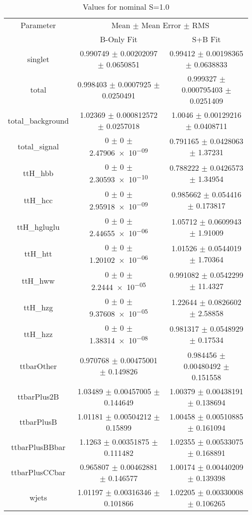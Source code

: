 \begin{table}
\centering
\caption{Values for nominal S=1.0}
\begin{tabular}{ccc}
\toprule
Parameter & \multicolumn{2}{c}{Mean $\pm$ Mean Error $\pm$ RMS}\\
 & B-Only Fit & S+B Fit\\
\midrule
singlet & \num{0.990749} $\pm$ \num{0.00202097} $\pm$ \num{0.0650851} & \num{0.99412} $\pm$ \num{0.00198365} $\pm$ \num{0.0638833}\\
total & \num{0.998403} $\pm$ \num{0.0007925} $\pm$ \num{0.0250491} & \num{0.999327} $\pm$ \num{0.000795403} $\pm$ \num{0.0251409}\\
total\_background & \num{1.02369} $\pm$ \num{0.000812572} $\pm$ \num{0.0257018} & \num{1.0046} $\pm$ \num{0.00129216} $\pm$ \num{0.0408711}\\
total\_signal & \num{0} $\pm$ \num{0} $\pm$ \num{2.47906e-09} & \num{0.791165} $\pm$ \num{0.0428063} $\pm$ \num{1.37231}\\
ttH\_hbb & \num{0} $\pm$ \num{0} $\pm$ \num{2.30593e-10} & \num{0.788222} $\pm$ \num{0.0426573} $\pm$ \num{1.34954}\\
ttH\_hcc & \num{0} $\pm$ \num{0} $\pm$ \num{2.95918e-09} & \num{0.985662} $\pm$ \num{0.054416} $\pm$ \num{0.173817}\\
ttH\_hgluglu & \num{0} $\pm$ \num{0} $\pm$ \num{2.44655e-06} & \num{1.05712} $\pm$ \num{0.0609943} $\pm$ \num{1.91009}\\
ttH\_htt & \num{0} $\pm$ \num{0} $\pm$ \num{1.20102e-06} & \num{1.01526} $\pm$ \num{0.0544019} $\pm$ \num{1.70364}\\
ttH\_hww & \num{0} $\pm$ \num{0} $\pm$ \num{2.2444e-05} & \num{0.991082} $\pm$ \num{0.0542299} $\pm$ \num{11.4327}\\
ttH\_hzg & \num{0} $\pm$ \num{0} $\pm$ \num{9.37608e-05} & \num{1.22644} $\pm$ \num{0.0826602} $\pm$ \num{2.58858}\\
ttH\_hzz & \num{0} $\pm$ \num{0} $\pm$ \num{1.38314e-08} & \num{0.981317} $\pm$ \num{0.0548929} $\pm$ \num{0.17534}\\
ttbarOther & \num{0.970768} $\pm$ \num{0.00475001} $\pm$ \num{0.149826} & \num{0.984456} $\pm$ \num{0.00480492} $\pm$ \num{0.151558}\\
ttbarPlus2B & \num{1.03489} $\pm$ \num{0.00457005} $\pm$ \num{0.144649} & \num{1.00379} $\pm$ \num{0.00438191} $\pm$ \num{0.138694}\\
ttbarPlusB & \num{1.01181} $\pm$ \num{0.00504212} $\pm$ \num{0.15899} & \num{1.00458} $\pm$ \num{0.00510885} $\pm$ \num{0.161094}\\
ttbarPlusBBbar & \num{1.1263} $\pm$ \num{0.00351875} $\pm$ \num{0.111482} & \num{1.02355} $\pm$ \num{0.00533075} $\pm$ \num{0.168891}\\
ttbarPlusCCbar & \num{0.965807} $\pm$ \num{0.00462881} $\pm$ \num{0.146577} & \num{1.00174} $\pm$ \num{0.00440209} $\pm$ \num{0.139398}\\
wjets & \num{1.01197} $\pm$ \num{0.00316346} $\pm$ \num{0.101866} & \num{1.02205} $\pm$ \num{0.00330008} $\pm$ \num{0.106265}\\
\bottomrule
\end{tabular}
\end{table}